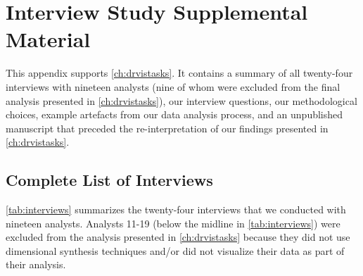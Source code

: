 
\chapter[Appendix: Interview Study]{Interview Study Supplemental Material}
\label{app:drvistasks}


This appendix supports \autoref{ch:drvistasks}. 
It contains a summary of all twenty-four interviews with nineteen analysts (nine of whom were excluded from the final analysis presented in \autoref{ch:drvistasks}), our interview questions, our methodological choices, example artefacts from our data analysis process, and an unpublished manuscript that preceded the re-interpretation of our findings presented in \autoref{ch:drvistasks}.


\section{Complete List of Interviews}
\label{app:drvistasks:interview-list}


\autoref{tab:interviews} summarizes the twenty-four interviews that we conducted with nineteen analysts.
Analysts 11-19 (below the midline in \autoref{tab:interviews}) were excluded from the analysis presented in \autoref{ch:drvistasks} because they did not use dimensional synthesis techniques and/or did not visualize their data as part of their analysis.


\setcounter{rownumber}{10}
        
